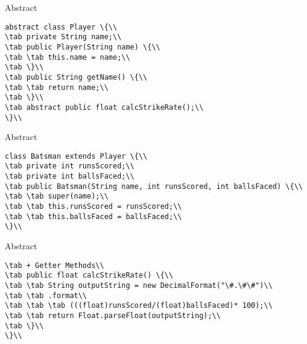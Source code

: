\documentclass[aspectratio=169,14pt,usenames,dvipsnames]{beamer}
\newcommand\tab[1][1cm]{\hspace*{#1}}
\begin{document}
\begin{frame}{Abstract}
\begin{lstlisting}
abstract class Player \{\\
\tab private String name;\\
\tab public Player(String name) \{\\
\tab \tab this.name = name;\\
\tab \}\\
\tab public String getName() \{\\
\tab \tab return name;\\
\tab \}\\
\tab abstract public float calcStrikeRate();\\
\}\\
\end{lstlisting}
\end{frame}

\begin{frame}{Abstract}
\begin{lstlisting}
class Batsman extends Player \{\\
\tab private int runsScored;\\
\tab private int ballsFaced;\\
\tab public Batsman(String name, int runsScored, int ballsFaced) \{\\
\tab \tab super(name);\\
\tab \tab this.runsScored = runsScored;\\
\tab \tab this.ballsFaced = ballsFaced;\\
\}\\
\end{lstlisting}
\end{frame}

\begin{frame}{Abstract}
\begin{lstlisting}
\tab + Getter Methods\\
\tab public float calcStrikeRate() \{\\
\tab \tab String outputString = new DecimalFormat("\#.\#\#")\\
\tab \tab .format\\
\tab \tab \tab (((float)runsScored/(float)ballsFaced)* 100);\\
\tab \tab return Float.parseFloat(outputString);\\
\tab \}\\
\}\\
\end{lstlisting}
\end{frame}
\end{document}
